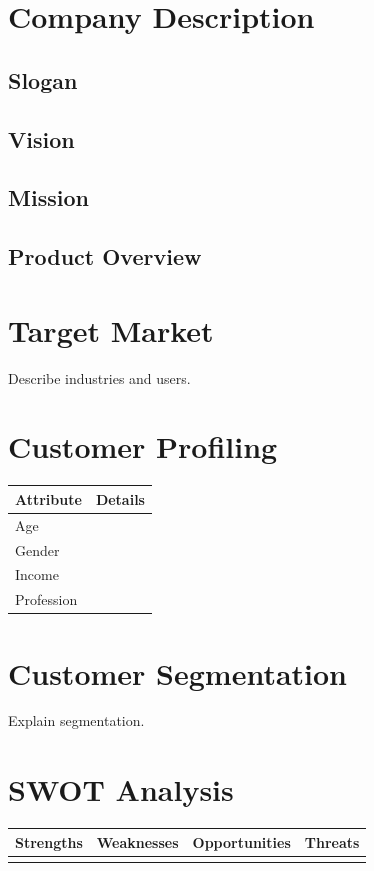 \documentclass[12pt,a4paper]{report}
\begin{document}
\chapter{Company Description}
\section{Slogan}
\section{Vision}
\section{Mission}
\section{Product Overview}

\chapter{Target Market}
Describe industries and users.

\chapter{Customer Profiling}
\begin{longtable}{|p{5cm}|p{8cm}|}
\hline
Attribute & Details \\
\hline
Age & \\
\hline
Gender & \\
\hline
Income & \\
\hline
Profession & \\
\hline
\end{longtable}

\chapter{Customer Segmentation}
Explain segmentation.

\chapter{SWOT Analysis}
\begin{longtable}{|p{4cm}|p{4cm}|p{4cm}|p{4cm}|}
\hline
Strengths & Weaknesses & Opportunities & Threats \\
\hline
 & & & \\
\hline
\end{longtable}
\end{document}

